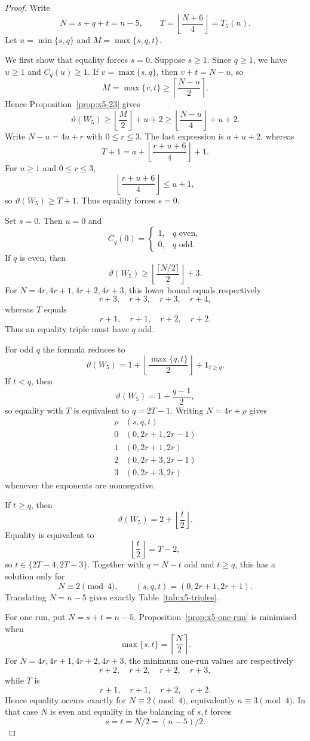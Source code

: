 \documentclass[11pt]{article}
\theoremstyle{definition}
\newcommand{\thetaas}{\vartheta}
\newcommand{\ind}{\mathbf 1}
\begin{document}
\begin{proof}
Write
\[
 N=s+q+t=n-5,
 \qquad
 T=\left\lfloor\frac{N+6}{4}\right\rfloor=T_5(n).
\]
Let $u=\min\{s,q\}$ and $M=\max\{s,q,t\}$.

We first show that equality forces $s=0$. Suppose $s\ge1$. Since $q\ge1$, we have $u\ge1$ and $C_q(u)\ge1$. If $v=\max\{s,q\}$, then $v+t=N-u$, so
\[
 M=\max\{v,t\}\ge\left\lceil\frac{N-u}{2}\right\rceil.
\]
Hence Proposition~\ref{prop:x5-23} gives
\[
 \thetaas(W_5)
 \ge \left\lfloor\frac M2\right\rfloor+u+2
 \ge \left\lfloor\frac{N-u}{4}\right\rfloor+u+2.
\]
Write $N-u=4a+r$ with $0\le r\le3$. The last expression is $a+u+2$, whereas
\[
 T+1=a+\left\lfloor\frac{r+u+6}{4}\right\rfloor+1.
\]
For $u\ge1$ and $0\le r\le3$,
\[
 \left\lfloor\frac{r+u+6}{4}\right\rfloor\le u+1,
\]
so $\thetaas(W_5)\ge T+1$. Thus equality forces $s=0$.

Set $s=0$. Then $u=0$ and
\[
 C_q(0)=
 \begin{cases}
 1,&q\text{ even},\\
 0,&q\text{ odd}.
 \end{cases}
\]
If $q$ is even, then
\[
 \thetaas(W_5)
 \ge \left\lfloor\frac{\lceil N/2\rceil}{2}\right\rfloor+3.
\]
For $N=4r,4r+1,4r+2,4r+3$, this lower bound equals respectively
\[
 r+3,\quad r+3,\quad r+3,\quad r+4,
\]
whereas $T$ equals
\[
 r+1,\quad r+1,\quad r+2,\quad r+2.
\]
Thus an equality triple must have $q$ odd.

For odd $q$ the formula reduces to
\[
 \thetaas(W_5)=
 1+\left\lfloor\frac{\max\{q,t\}}2\right\rfloor+\ind_{t\ge q}.
\]
If $t<q$, then
\[
 \thetaas(W_5)=1+\frac{q-1}{2},
\]
so equality with $T$ is equivalent to $q=2T-1$. Writing $N=4r+\rho$ gives
\[
\begin{array}{c|c}
\rho&(s,q,t)\\ \hline
0&(0,2r+1,2r-1)\\
1&(0,2r+1,2r)\\
2&(0,2r+3,2r-1)\\
3&(0,2r+3,2r)
\end{array}
\]
whenever the exponents are nonnegative.

If $t\ge q$, then
\[
 \thetaas(W_5)=2+\left\lfloor\frac t2\right\rfloor.
\]
Equality is equivalent to
\[
 \left\lfloor\frac t2\right\rfloor=T-2,
\]
so $t\in\{2T-4,2T-3\}$. Together with $q=N-t$ odd and $t\ge q$, this has a solution only for
\[
 N\equiv2\pmod4,\qquad (s,q,t)=(0,2r+1,2r+1).
\]
Translating $N=n-5$ gives exactly Table~\ref{tab:x5-triples}.

For one run, put $N=s+t=n-5$. Proposition~\ref{prop:x5-one-run} is minimised when
\[
 \max\{s,t\}=\left\lceil\frac N2\right\rceil.
\]
For $N=4r,4r+1,4r+2,4r+3$, the minimum one-run values are respectively
\[
 r+2,\quad r+2,\quad r+2,\quad r+3,
\]
while $T$ is
\[
 r+1,\quad r+1,\quad r+2,\quad r+2.
\]
Hence equality occurs exactly for $N\equiv2\pmod4$, equivalently $n\equiv3\pmod4$. In that case $N$ is even and equality in the balancing of $s,t$ forces
\[
 s=t=N/2=(n-5)/2.
\]
\end{proof}
\end{document}
